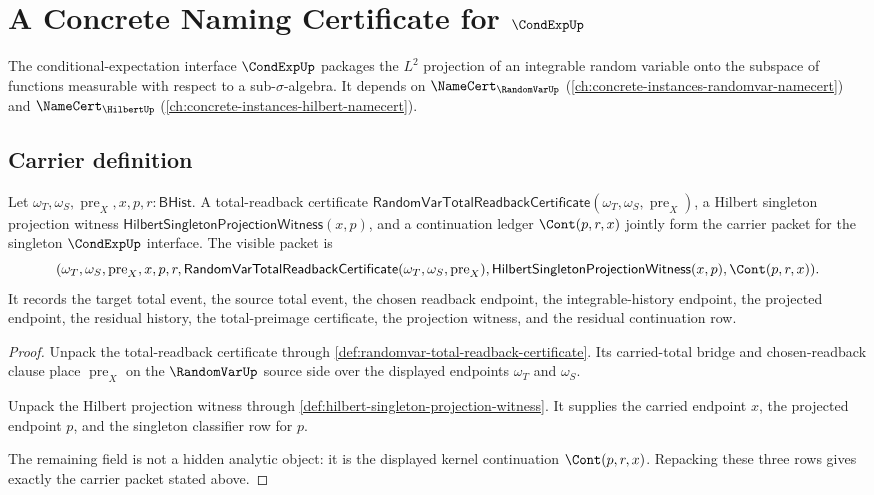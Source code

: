 \chapter{A Concrete Naming Certificate for $\CondExpUp$}
\label{ch:concrete-instances-condexp-namecert}

The conditional-expectation interface $\CondExpUp$ packages the $L^2$ projection of an integrable random variable onto the subspace of functions measurable with respect to a sub-$\sigma$-algebra. It depends on $\NameCert_{\RandomVarUp}$ (\autoref{ch:concrete-instances-randomvar-namecert}) and $\NameCert_{\HilbertUp}$ (\autoref{ch:concrete-instances-hilbert-namecert}).

\section{Carrier definition}
\label{sec:condexp-carrier}

\begin{theorem}
\label{thm:condexp-carrier-obligation}
Let $\omega_T,\omega_S,\operatorname{pre}_X,x,p,r:\mathsf{BHist}$. A
total-readback certificate
$\mathsf{RandomVarTotalReadbackCertificate}(\omega_T,\omega_S,\operatorname{pre}_X)$,
a Hilbert singleton projection witness
$\mathsf{HilbertSingletonProjectionWitness}(x,p)$, and a continuation ledger
$\Cont(p,r,x)$ jointly form the carrier packet for the singleton
$\CondExpUp$ interface. The visible packet is
$$
(\omega_T,\omega_S,\operatorname{pre}_X,x,p,r,
 \mathsf{RandomVarTotalReadbackCertificate}(\omega_T,\omega_S,\operatorname{pre}_X),
 \mathsf{HilbertSingletonProjectionWitness}(x,p),
 \Cont(p,r,x)).
$$
It records the target total event, the source total event, the chosen
readback endpoint, the integrable-history endpoint, the projected endpoint,
the residual history, the total-preimage certificate, the projection witness,
and the residual continuation row.
\end{theorem}
\begin{proof}
Unpack the total-readback certificate through
\autoref{def:randomvar-total-readback-certificate}. Its carried-total bridge
and chosen-readback clause place $\operatorname{pre}_X$ on the
$\RandomVarUp$ source side over the displayed endpoints $\omega_T$ and
$\omega_S$.

Unpack the Hilbert projection witness through
\autoref{def:hilbert-singleton-projection-witness}. It supplies the carried
endpoint $x$, the projected endpoint $p$, and the singleton classifier row
for $p$.

The remaining field is not a hidden analytic object: it is the displayed
kernel continuation $\Cont(p,r,x)$. Repacking these three rows gives exactly
the carrier packet stated above.
\end{proof}


